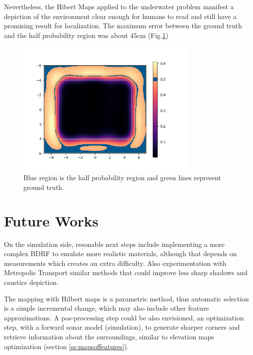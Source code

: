Nevertheless, the Hibert Maps applied to the underwater problem manifest a
depiction of the environment clear enough for humans to read and still have a
promising result for localization. The maximum error between the ground truth
and the half probability region was about $45$cm (Fig.\ref{fig:halfprob})


\begin{figure}[h]
	\centering
	\includegraphics[width=0.8\textwidth]{Chap5/fig/wall_one_full_z_-1_change}
	\caption{Blue region is the half probability region and green lines represent
	ground truth.}
	\label{fig:halfprob}
\end{figure}

\section{Future Works}

On the simulation side, resonable next steps include implementing a more complex
BDRF to emulate more realistic materials, although that depends on measurements
which creates an extra difficulty. Also experimentation with Metropolis
Transport similar methods that could improve less sharp shadows and caustics
depiction.

The mapping with Hilbert maps is a parametric method, thus automatic selection
is a simple incremental change, which may also include other feature
approximations. A pos-processing step could be also envisioned, an optimization
step, with a forward sonar model (simulation), to generate sharper corners and
retrieve information about the surroundings, similar to elevation maps optimization (section
\ref{ss:mapsoffeatures}).
